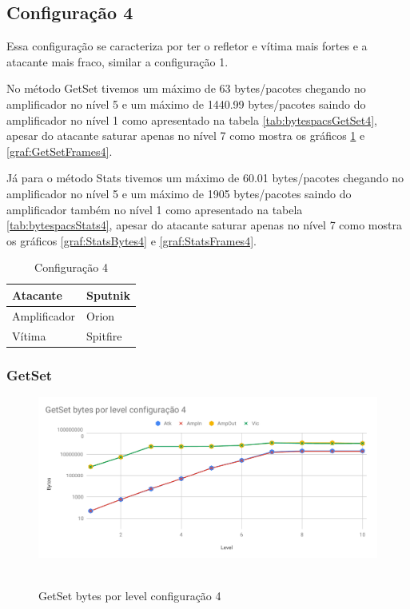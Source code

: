 \subsection*{Configuração 4}

Essa configuração se caracteriza por ter o refletor e vítima mais fortes e a atacante
mais fraco, similar a configuração 1.

No método GetSet tivemos um máximo de 63 bytes/pacotes chegando no amplificador no nível 5 e um máximo de 1440.99 bytes/pacotes saindo do amplificador no nível 1 como apresentado na tabela \ref{tab:bytespacsGetSet4}, apesar do atacante saturar apenas no nível 7 como mostra os gráficos \ref{graf:GetSetBytes4} e \ref{graf:GetSetFrames4}.

Já para o método Stats tivemos um máximo de 60.01 bytes/pacotes chegando no amplificador no nível 5 e um máximo de 1905 bytes/pacotes saindo do amplificador também no nível 1 como apresentado na tabela \ref{tab:bytespacsStats4}, apesar do atacante saturar apenas no nível 7 como mostra os gráficos \ref{graf:StatsBytes4} e \ref{graf:StatsFrames4}.

\begin{table}[H]
\centering
\caption{Configuração 4}
\begin{tabular}{|l|l|}
\hline
Atacante     & Sputnik  \\ \hline
Amplificador & Orion    \\ \hline
Vítima       & Spitfire \\ \hline
\end{tabular}
\end{table}

\subsubsection{GetSet}

\begin{figure}[H]
     \centering
     \label{graf:GetSetBytes4}
     \includegraphics[scale=0.6]{img/capturas/GetSetBLC4.pdf}\
     \caption{GetSet bytes por level configuração 4}
\end{figure}

